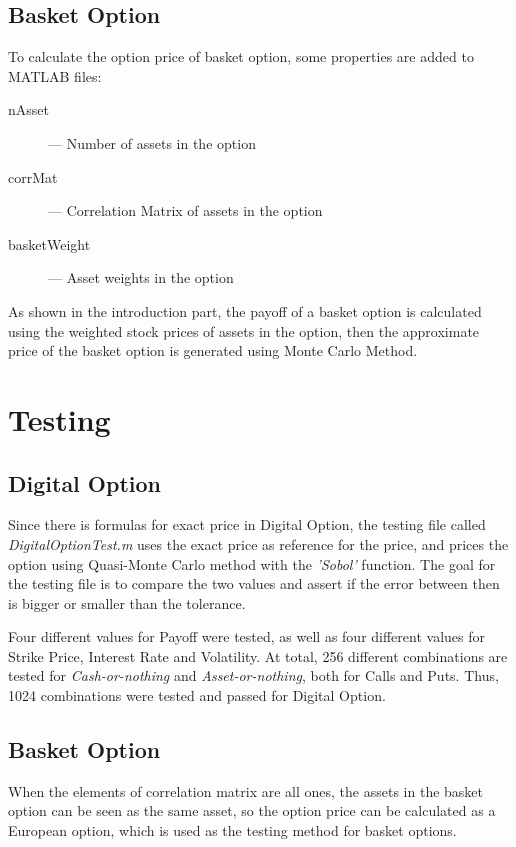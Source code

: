 \documentclass[]{elsarticle}
\theoremstyle{definition}
\theoremstyle{remark}
\begin{document}
\subsection{Basket Option}
To calculate the option price of basket option, some properties are added to MATLAB files:
\begin{description}
\item[nAsset]--- Number of assets in the option
\item[corrMat]--- Correlation Matrix of assets in the option
\item[basketWeight]--- Asset weights in the option 
\end{description}

As shown in the introduction part, the payoff of a basket option is calculated using the weighted stock prices of assets in the option, then the approximate price of the basket option is generated using Monte Carlo Method.

\section{Testing}
\subsection{Digital Option}
Since there is formulas for exact price in Digital Option, the testing file called \textit{DigitalOptionTest.m} uses the exact price as reference for the price, and prices the option using Quasi-Monte Carlo method with the \textit{'Sobol'} function. The goal for the testing file is to compare the two values and assert if the error between then is bigger or smaller than the tolerance. 

Four different values for Payoff were tested, as well as four different values for Strike Price, Interest Rate and Volatility. At total, 256 different combinations are tested for \textit{Cash-or-nothing} and \textit{Asset-or-nothing}, both for Calls and Puts. Thus, 1024 combinations were tested and passed for Digital Option.


\subsection{Basket Option}
When the elements of correlation matrix are all ones, the assets in the basket option can be seen as the same asset, so the option price can be calculated as a European option, which is used as the testing method for basket options.
\end{document}
